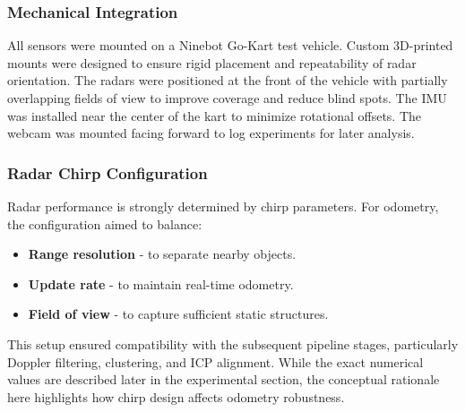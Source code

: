 \subsubsection{Mechanical Integration}
All sensors were mounted on a Ninebot Go-Kart test vehicle.  
Custom 3D-printed mounts were designed to ensure rigid placement and repeatability of radar orientation.  
The radars were positioned at the front of the vehicle with partially overlapping fields of view to improve coverage and reduce blind spots.  
The IMU was installed near the center of the kart to minimize rotational offsets.  
The webcam was mounted facing forward to log experiments for later analysis.  

\subsubsection{Radar Chirp Configuration}
Radar performance is strongly determined by chirp parameters.  
For odometry, the configuration aimed to balance:  
\begin{itemize}
    \item \textbf{Range resolution} - to separate nearby objects.  
    \item \textbf{Update rate} - to maintain real-time odometry.  
    \item \textbf{Field of view} - to capture sufficient static structures.  
\end{itemize}

This setup ensured compatibility with the subsequent pipeline stages, particularly Doppler filtering, clustering, and ICP alignment.  
While the exact numerical values are described later in the experimental section, the conceptual rationale here highlights how chirp design affects odometry robustness.  
